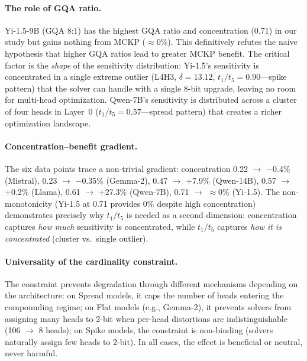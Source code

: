 \documentclass[11pt,a4paper]{article}
\newcommand{\tratio}{\ensuremath{t_1/t_5}}
\begin{document}
\paragraph{The role of GQA ratio.}
Yi-1.5-9B (GQA 8:1) has the highest GQA ratio and concentration (0.71) in our study but gains nothing from MCKP ($\approx$0\%).
This definitively refutes the naive hypothesis that higher GQA ratios lead to greater MCKP benefit.
The critical factor is the \emph{shape} of the sensitivity distribution: Yi-1.5's sensitivity is concentrated in a single extreme outlier (L4H3, $\delta = 13.12$, $\tratio = 0.90$---spike pattern) that the solver can handle with a single 8-bit upgrade, leaving no room for multi-head optimization.
Qwen-7B's sensitivity is distributed across a cluster of four heads in Layer~0 ($\tratio = 0.57$---spread pattern) that creates a richer optimization landscape.

\paragraph{Concentration--benefit gradient.}
The six data points trace a non-trivial gradient:
concentration 0.22 $\to$ $-$0.4\% (Mistral),
0.23 $\to$ $-$0.35\% (Gemma-2),
0.47 $\to$ +7.9\% (Qwen-14B),
0.57 $\to$ +0.2\% (Llama),
0.61 $\to$ +27.3\% (Qwen-7B),
0.71 $\to$ $\approx$0\% (Yi-1.5).
The non-monotonicity (Yi-1.5 at 0.71 provides 0\% despite high concentration) demonstrates precisely why $\tratio$ is needed as a second dimension: concentration captures \emph{how much} sensitivity is concentrated, while $\tratio$ captures \emph{how it is concentrated} (cluster vs.\ single outlier).

\paragraph{Universality of the cardinality constraint.}
The constraint prevents degradation through different mechanisms depending on the architecture:
on Spread models, it caps the number of heads entering the compounding regime;
on Flat models (e.g., Gemma-2), it prevents solvers from assigning many heads to 2-bit when per-head distortions are indistinguishable (106 $\to$ 8 heads);
on Spike models, the constraint is non-binding (solvers naturally assign few heads to 2-bit).
In all cases, the effect is beneficial or neutral, never harmful.

\end{document}
